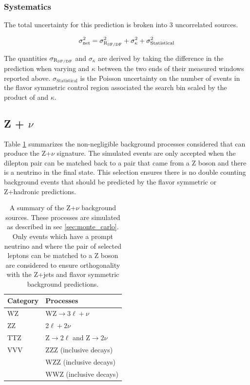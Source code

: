     \subsubsection{Systematics}

      The total uncertainty for this prediction is broken into 3 uncorrelated sources.

      \[
        \sigma^2_{\text{net}} = \sigma^2_{\text{\ensuremath{\mathrm{R_{SF/DF}}}}} +  \sigma^2_{\kappa} + \sigma^2_{\text{Statistical}}
      \]

      The quantities $\sigma_{\text{\ensuremath{\mathrm{R_{SF/DF}}}}}$ and $\sigma_{\kappa}$ are derived by taking the difference in the prediction when varying \rsfof and $\kappa$ between the two ends of their measured windows reported above. $\sigma_{\text{Statistical}}$ is the Poisson uncertainty on the number of events in the flavor symmetric control region associated the search bin scaled by the product of \rsfof and $\kappa$.

  \subsection{Z + $\nu$} \label{sec:z_+_neutrino}

    Table \ref{tab:znu_processes} summarizes the non-negligible background processes considered that can produce the Z+$\nu$ signature. The simulated events are only accepted when the dilepton pair can be matched back to a pair that came from a Z boson and there is a neutrino in the final state. This selection ensures there is no double counting background events that should be predicted by the flavor symmetric or Z+hadronic predictions.


    \begin{table}[!h]
      \centering
      \caption{\label{tab:znu_processes}
      A summary of the Z+$\nu$ background sources. These processes are simulated as described in sec \ref{sec:monte_carlo}. Only events which have a prompt neutrino and where the pair of selected leptons can be matched to a Z boson are considered to ensure orthogonality with the Z+jets and flavor symmetric background predictions.
      }
      \begin{center}
        \begin{tabular} {l | l}
        \hline
        \hline
        Category & Processes \\
        \hline
        WZ     & WZ$\to 3\ell + \nu$           \\
        ZZ     & 2$\ell + 2\nu$                \\
        TTZ    & Z$\to 2\ell$ and Z$\to 2\nu$  \\
        VVV    & ZZZ (inclusive decays)        \\
               & WZZ (inclusive decays)        \\
               & WWZ (inclusive decays)        \\
        \hline
        \hline
        \end{tabular}
      \end{center}
    \end{table}


